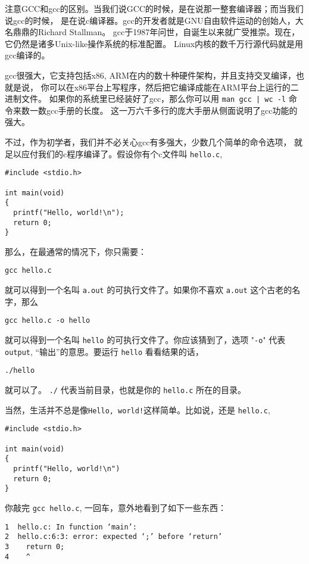 \documentclass{wx672article}
\begin{document}
注意GCC和gcc的区别。当我们说GCC的时候，是在说那一整套编译器；而当我们说gcc的时候，
是在说c编译器。gcc的开发者就是GNU自由软件运动的创始人，大名鼎鼎的Richard Stallman。
gcc于1987年问世，自诞生以来就广受推崇。现在，它仍然是诸多Unix-like操作系统的标准配置。
Linux内核的数千万行源代码就是用gcc编译的。

gcc很强大，它支持包括x86, ARM在内的数十种硬件架构，并且支持交叉编译，也就是说，
你可以在x86平台上写程序，然后把它编译成能在ARM平台上运行的二进制文件。
如果你的系统里已经装好了gcc，那么你可以用 \texttt{man gcc | wc -l} 命令来数一数gcc手册的长度。
这一万六千多行的庞大手册从侧面说明了gcc功能的强大。

不过，作为初学者，我们并不必关心gcc有多强大，少数几个简单的命令选项，
就足以应付我们的c程序编译了。假设你有个c文件叫 \texttt{hello.c},

\begin{verbatim}
#include <stdio.h>

int main(void)
{
  printf("Hello, world!\n");
  return 0;
}
\end{verbatim}

那么，在最通常的情况下，你只需要：
\begin{verbatim}
gcc hello.c
\end{verbatim}
就可以得到一个名叫 \texttt{a.out} 的可执行文件了。如果你不喜欢 \texttt{a.out} 这个古老的名字，那么
\begin{verbatim}
gcc hello.c -o hello
\end{verbatim}
就可以得到一个名叫 \texttt{hello} 的可执行文件了。你应该猜到了，选项 "\texttt{-o}" 代表 \texttt{output},
“输出”的意思。要运行 \texttt{hello} 看看结果的话，
\begin{verbatim}
./hello
\end{verbatim}
就可以了。 \texttt{./} 代表当前目录，也就是你的 \texttt{hello.c} 所在的目录。

当然，生活并不总是像\texttt{Hello, world!}这样简单。比如说，还是 \texttt{hello.c},

\begin{verbatim}
#include <stdio.h>

int main(void)
{
  printf("Hello, world!\n")
  return 0;
}
\end{verbatim}

你敲完 \texttt{gcc hello.c}, 一回车，意外地看到了如下一些东西：
\begin{verbatim}
1  hello.c: In function ‘main’:
2  hello.c:6:3: error: expected ‘;’ before ‘return’
3    return 0;
4    ^
\end{verbatim}
\end{document}
